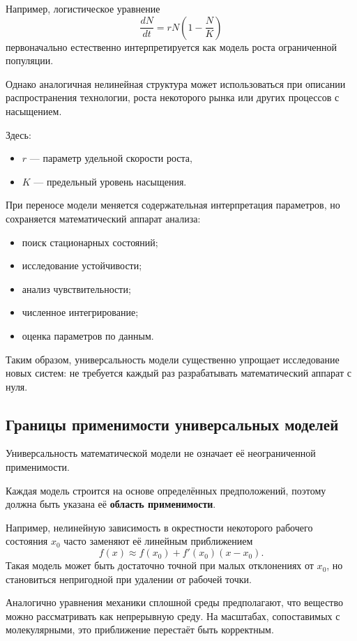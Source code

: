 Например, логистическое уравнение
\[
\frac{dN}{dt}
=
rN\left(1-\frac{N}{K}\right)
\]
первоначально естественно интерпретируется как модель роста ограниченной популяции.

Однако аналогичная нелинейная структура может использоваться при описании распространения технологии, роста некоторого рынка или других процессов с насыщением.

Здесь:
\begin{itemize}
	\item $r$ --- параметр удельной скорости роста,
	\item $K$ --- предельный уровень насыщения.
\end{itemize}

При переносе модели меняется содержательная интерпретация параметров,
но сохраняется математический аппарат анализа:
\begin{itemize}
	\item поиск стационарных состояний;
	\item исследование устойчивости;
	\item анализ чувствительности;
	\item численное интегрирование;
	\item оценка параметров по данным.
\end{itemize}

Таким образом, универсальность модели существенно упрощает исследование новых систем: не требуется каждый раз разрабатывать математический аппарат с нуля.

\subsection{Границы применимости универсальных моделей}

Универсальность математической модели не означает её неограниченной применимости.

Каждая модель строится на основе определённых предположений, поэтому должна быть указана её \textbf{область применимости}.

Например, нелинейную зависимость в окрестности некоторого рабочего состояния $x_0$ часто заменяют её линейным приближением
\[
f(x)\approx f(x_0)+f'(x_0)(x-x_0).
\]
Такая модель может быть достаточно точной при малых отклонениях от $x_0$, но становиться непригодной при удалении от рабочей точки.

Аналогично уравнения механики сплошной среды предполагают, что вещество можно рассматривать как непрерывную среду. На масштабах, сопоставимых с молекулярными, это приближение перестаёт быть корректным.

